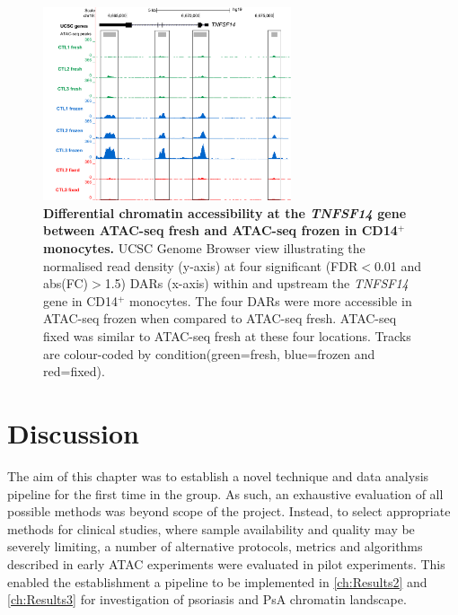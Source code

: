 	
\begin{figure}[htbp]
\centering
\includegraphics[width=0.65\textwidth]{./Results1/pdfs/Core_CD14_TNFSF14_track_UCSC}
\caption[Differential chromatin accessibility at the \textit{TNFSF14} gene between ATAC-seq fresh and ATAC-seq frozen in CD14$^+$ monocytes.]{\textbf{Differential chromatin accessibility at the \textit{TNFSF14} gene between ATAC-seq fresh and ATAC-seq frozen in CD14$^+$ monocytes.} UCSC Genome Browser view illustrating the normalised read density (y-axis) at four significant (FDR$<$0.01 and abs(FC)$>$1.5) DARs (x-axis) within and upstream the \textit{TNFSF14} gene in CD14$^+$ monocytes. The four DARs were more accessible in ATAC-seq frozen when compared to ATAC-seq fresh. ATAC-seq fixed was similar to ATAC-seq fresh at these four locations. Tracks are colour-coded by condition(green=fresh, blue=frozen and red=fixed).}
\label{figure:Core_CD14_differential_TNFSF14}
\end{figure} 	



\section{Discussion}

The aim of this chapter was to establish a novel technique and data analysis pipeline for the first time in the group. As such, an exhaustive evaluation of all possible methods was beyond scope of the project. Instead, to select appropriate methods for clinical studies, where sample availability and quality may be severely limiting, a number of alternative protocols, metrics and algorithms described in early ATAC experiments were evaluated in pilot experiments. This enabled the establishment a pipeline to be implemented in \ref{ch:Results2} and \ref{ch:Results3} for investigation of psoriasis and PsA chromatin landscape.

